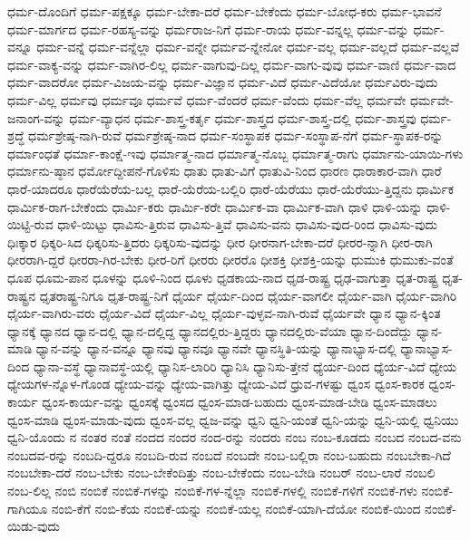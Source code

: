 {ಧರ್ಮ-ದೊಂದಿಗೆ
ಧರ್ಮ-ಪಕ್ಷಕ್ಕೂ
ಧರ್ಮ-ಬೇಕಾ-ದರೆ
ಧರ್ಮ-ಬೇಕೆಂದು
ಧರ್ಮ-ಬೋಧ-ಕರು
ಧರ್ಮ-ಭಾವನೆ
ಧರ್ಮ-ಮಾರ್ಗದ
ಧರ್ಮ-ರಹಸ್ಯ-ವನ್ನು
ಧರ್ಮರಾಜ-ನಿಗೆ
ಧರ್ಮ-ರಾಯ
ಧರ್ಮ-ವನ್ನಲ್ಲ
ಧರ್ಮ-ವನ್ನು
ಧರ್ಮ-ವನ್ನೂ
ಧರ್ಮ-ವನ್ನೆ
ಧರ್ಮ-ವನ್ನೆಲ್ಲಾ
ಧರ್ಮ-ವನ್ನೇ
ಧರ್ಮವ-ನ್ನೇನೋ
ಧರ್ಮ-ವಲ್ಲ
ಧರ್ಮ-ವಲ್ಲದೆ
ಧರ್ಮ-ವಲ್ಲವೆ
ಧರ್ಮ-ವಾಕ್ಯ-ವನ್ನು
ಧರ್ಮ-ವಾಗಿರ-ಲಿಲ್ಲ
ಧರ್ಮ-ವಾಗುವು-ದಿಲ್ಲ
ಧರ್ಮ-ವಾಗು-ವುವು
ಧರ್ಮ-ವಾಣಿ
ಧರ್ಮ-ವಾದ
ಧರ್ಮ-ವಾದರೋ
ಧರ್ಮ-ವಿಜಯ-ವನ್ನು
ಧರ್ಮ-ವಿಜ್ಞಾನ
ಧರ್ಮ-ವಿದೆ
ಧರ್ಮ-ವಿದೆಯೋ
ಧರ್ಮವಿರು-ವುದು
ಧರ್ಮ-ವಿಲ್ಲ
ಧರ್ಮವು
ಧರ್ಮವೂ
ಧರ್ಮವೆ
ಧರ್ಮ-ವೆಂದರೆ
ಧರ್ಮ-ವೆಂದು
ಧರ್ಮ-ವೆಲ್ಲ
ಧರ್ಮವೇ
ಧರ್ಮವೇ-ಜನಾಂಗ-ವನ್ನು
ಧರ್ಮ-ವ್ಯಾಧನ
ಧರ್ಮ-ಶಾಸ್ತ್ರ-ಕರ್ತೃ
ಧರ್ಮ-ಶಾಸ್ತ್ರದ
ಧರ್ಮ-ಶಾಸ್ತ್ರ-ದಲ್ಲಿ
ಧರ್ಮ-ಶಾಸ್ತ್ರವು
ಧರ್ಮ-ಶ್ರದ್ಧೆ
ಧರ್ಮಶ್ರೇಷ್ಠ-ನಾಗಿ-ರುವೆ
ಧರ್ಮಶ್ರೇಷ್ಠ-ನಾದ
ಧರ್ಮ-ಸಂಸ್ಥಾಪಕ
ಧರ್ಮ-ಸಂಸ್ಥಾಪ-ನೆಗೆ
ಧರ್ಮ-ಸ್ಥಾಪಕ-ರನ್ನು
ಧರ್ಮಾಂಧತೆ
ಧರ್ಮಾ-ಕಾಂಕ್ಷೆ-ಇವು
ಧರ್ಮಾತ್ಮ-ನಾದ
ಧರ್ಮಾತ್ಮ-ನೊಬ್ಬ
ಧರ್ಮಾತ್ಮ-ರಾಗು
ಧರ್ಮಾನು-ಯಾಯಿ-ಗಳು
ಧರ್ಮಾನು-ಷ್ಠಾನ
ಧರ್ಮೋದ್ದೀಪನೆ-ಗೊಳಿಸು
ಧಾತು
ಧಾತು-ವಿಗೆ
ಧಾತುವಿ-ನಿಂದ
ಧಾರಣ
ಧಾರಾಕಾರ-ವಾಗಿ
ಧಾರೆ
ಧಾರೆ-ಯಾದರೂ
ಧಾರೆಯೆರೆಯ-ಬಲ್ಲ
ಧಾರೆ-ಯೆರೆಯ-ಬಲ್ಲಿರಿ
ಧಾರೆ-ಯೆರೆಯು
ಧಾರೆ-ಯೆರೆಯು-ತ್ತಿದ್ದನು
ಧಾರ್ಮಿಕ
ಧಾರ್ಮಿಕ-ರಾಗ-ಬೇಕೆಂದು
ಧಾರ್ಮಿ-ಕರು
ಧಾರ್ಮಿ-ಕರೇ
ಧಾರ್ಮಿಕ-ವಾ
ಧಾರ್ಮಿಕ-ವಾಗಿ
ಧಾಳಿ
ಧಾಳಿ-ಯನ್ನು
ಧಾಳಿ-ಯಿಟ್ಟಿ-ರುವ
ಧಾಳಿ-ಯಿಟ್ಟು
ಧಾವಿಸು-ತ್ತಿರುವ
ಧಾವಿಸು-ತ್ತಿವೆ
ಧಾವಿಸು-ವನು
ಧಾವಿಸು-ವುದ-ರಿಂದ
ಧಾವಿಸು-ವುದು
ಧಿಃಕ್ಕಾರ
ಧಿಕ್ಕರಿ-ಸಿದ
ಧಿಕ್ಕರಿಸು-ತ್ತಿದರು
ಧಿಕ್ಕರಿಸು-ವುದನ್ನು
ಧೀರ
ಧೀರನಾಗ-ಬೇಕಾ-ದರೆ
ಧೀರರ-ನ್ನಾಗಿ
ಧೀರ-ರಾಗಿ
ಧೀರರಾಗಿ-ದ್ದರೆ
ಧೀರರಾ-ಗಿರ-ಬೇಕು
ಧೀರ-ರಿಗೆ
ಧೀರರು
ಧೀರರೊ
ಧೀಶಕ್ತಿ
ಧೀಶಕ್ತಿ-ಯನ್ನು
ಧುಮುಕಿ
ಧುಮುಕು-ವಂತೆ
ಧೂಪ
ಧೂಮ-ಪಾನ
ಧೂಳನ್ನು
ಧೂಳಿ-ನಿಂದ
ಧೂಳು
ಧೃಡಕಾಯ-ನಾದ
ಧೃಡ-ರಾಷ್ಟ್ರ
ಧೃಢ-ವಾಗುತ್ತಾ
ಧೃತ-ರಾಷ್ಟ್ರ
ಧೃತ-ರಾಷ್ಟ್ರನ
ಧೃತರಾಷ್ಟ್ರ-ನಿಗೂ
ಧೃತ-ರಾಷ್ಟ್ರ-ನಿಗೆ
ಧೈರ್ಯ
ಧೈರ್ಯ-ದಿಂದ
ಧೈರ್ಯ-ವಾಗಲೀ
ಧೈರ್ಯ-ವಾಗಿ
ಧೈರ್ಯ-ವಾಗಿರಿ
ಧೈರ್ಯ-ವಾಗಿರು-ವರು
ಧೈರ್ಯ-ವಿದೆ
ಧೈರ್ಯ-ವಿಲ್ಲ
ಧೈರ್ಯ-ವುಳ್ಳವ-ನಾಗಿ-ರುವೆ
ಧೈರ್ಯವೇ
ಧ್ಯಾನ
ಧ್ಯಾನ-ಕ್ಕಿಂತ
ಧ್ಯಾನಕ್ಕೆ
ಧ್ಯಾನದ
ಧ್ಯಾನ-ದಲ್ಲಿ
ಧ್ಯಾನ-ದಲ್ಲಿದ್ದ
ಧ್ಯಾನದಲ್ಲಿರು-ತ್ತಿದ್ದರು
ಧ್ಯಾನದಲ್ಲಿರು-ವೆಯಾ
ಧ್ಯಾನ-ದಿಂದೆದ್ದು
ಧ್ಯಾನ-ಮಾಡಿ
ಧ್ಯಾನ-ವನ್ನು
ಧ್ಯಾನ-ವನ್ನೂ
ಧ್ಯಾನವು
ಧ್ಯಾನವೂ
ಧ್ಯಾನವೇ
ಧ್ಯಾನಸ್ಥಿತಿ-ಯನ್ನು
ಧ್ಯಾನಾಭ್ಯಾಸ-ದಲ್ಲಿ
ಧ್ಯಾನಾಭ್ಯಾಸ-ದಿಂದ
ಧ್ಯಾನಾ-ವಸ್ಥೆ
ಧ್ಯಾನಾವಸ್ಥೆ-ಯಲ್ಲಿ
ಧ್ಯಾನಿಸ-ಲಾರಿರಿ
ಧ್ಯಾನಿಸಿ
ಧ್ಯಾನಿಸು-ತ್ತೇನೆ
ಧ್ಯೆರ್ಯ-ದಿಂದ
ಧ್ಯೆರ್ಯ-ವಿದೆ
ಧ್ಯೇಯ
ಧ್ಯೇಯಗಳ-ನ್ನೊಳ-ಗೊಂಡ
ಧ್ಯೇಯ-ವನ್ನು
ಧ್ಯೇಯ-ವಾಗಿತ್ತು
ಧ್ಯೇಯ-ವಿದೆ
ಧ್ರುವ-ಗಳಷ್ಟು
ಧ್ವಂಸ
ಧ್ವಂಸ-ಕಾರಕ
ಧ್ವಂಸ-ಕಾರ್ಯ
ಧ್ವಂಸ-ಕಾರ್ಯ-ವನ್ನು
ಧ್ವಂಸಕ್ಕೆ
ಧ್ವಂಸದ
ಧ್ವಂಸ-ಮಾಡ-ಬಹುದು
ಧ್ವಂಸ-ಮಾಡ-ಬೇಡಿ
ಧ್ವಂಸ-ಮಾಡಲು
ಧ್ವಂಸ-ಮಾಡಿ
ಧ್ವಂಸ-ಮಾಡು-ವುದು
ಧ್ವಂಸ-ವಲ್ಲ
ಧ್ವಜ-ವನ್ನು
ಧ್ವನಿ
ಧ್ವನಿ-ಯಂತೆ
ಧ್ವನಿ-ಯನ್ನು
ಧ್ವನಿ-ಯಲ್ಲಿ
ಧ್ವನಿಯು
ಧ್ವನಿ-ಯೊಂದು
ನ
ನಂತರ
ನಂತೆ
ನಂದದ
ನಂದರ
ನಂದ-ರನ್ನು
ನಂದರು
ನಂಬ
ನಂಬ-ಕೂಡದು
ನಂಬದ
ನಂಬದ-ವನು
ನಂಬದವ-ರನ್ನು
ನಂಬದಿ-ದ್ದರೂ
ನಂಬದಿ-ರುವ
ನಂಬದೆ
ನಂಬದೇ
ನಂಬ-ಬಲ್ಲಿರಾ
ನಂಬ-ಬಹುದು
ನಂಬಬೇಕಾ-ಗಿದೆ
ನಂಬಬೇಕಾ-ದರೆ
ನಂಬ-ಬೇಕು
ನಂಬ-ಬೇಕೆಂದಿತ್ತು
ನಂಬ-ಬೇಕೆಂದು
ನಂಬ-ಬೇಡಿ
ನಂಬರ್
ನಂಬ-ಲಾರೆ
ನಂಬಲಿ
ನಂಬ-ಲಿಲ್ಲ
ನಂಬಿ
ನಂಬಿಕೆ
ನಂಬಿಕೆ-ಗಳನ್ನು
ನಂಬಿಕೆ-ಗಳ-ನ್ನೆಲ್ಲಾ
ನಂಬಿಕೆ-ಗಳಲ್ಲಿ
ನಂಬಿಕೆ-ಗಳಿಗೆ
ನಂಬಿಕೆ-ಗಳು
ನಂಬಿಕೆ-ಗಾಗಿಯೂ
ನಂಬಿ-ಕೆಗೆ
ನಂಬಿ-ಕೆಯ
ನಂಬಿಕೆ-ಯನ್ನು
ನಂಬಿಕೆ-ಯಲ್ಲ
ನಂಬಿಕೆ-ಯಾಗಿ-ದೆಯೋ
ನಂಬಿಕೆ-ಯಿಂದ
ನಂಬಿಕೆ-ಯಿಡು-ವುದು
}
